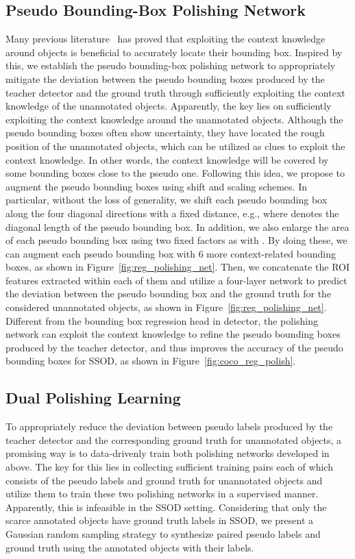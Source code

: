 \documentclass[letterpaper]{article} \usepackage{aaai23}  \usepackage{times}  \usepackage{helvet}  \usepackage{courier}  \usepackage[hyphens]{url}  \usepackage{graphicx} \urlstyle{rm} \def\UrlFont{\rm}  \usepackage{natbib}  \usepackage{caption} \frenchspacing  \setlength{\pdfpagewidth}{8.5in}  \setlength{\pdfpageheight}{11in}  \usepackage{algorithm}
\begin{document}
\subsection{Pseudo Bounding-Box Polishing Network}
\label{sec::regression_polishing_network}
Many previous literature~\cite{song2020revisiting} has proved that exploiting the context knowledge around objects is beneficial to accurately locate their bounding box. Inspired by this, we establish the pseudo bounding-box polishing network to appropriately mitigate the deviation between the pseudo bounding boxes produced by the teacher detector and the ground truth through sufficiently exploiting the context knowledge of the unannotated objects. Apparently, the key lies on sufficiently exploiting the context knowledge around the unannotated objects. Although the pseudo bounding boxes often show uncertainty, they have located the rough position of the unannotated objects, which can be utilized as clues to exploit the context knowledge. In other words, the context knowledge will be covered by some bounding boxes close to the pseudo one. Following this idea, we propose to augment the pseudo bounding boxes using shift and scaling schemes. In particular, without the loss of generality, we shift each pseudo bounding box along the four diagonal directions with a fixed distance, e.g.,  where  denotes the diagonal length of the pseudo bounding box. In addition, we also enlarge the area of each pseudo bounding box using two fixed factors as  with . By doing these, we can augment each pseudo bounding box with 6 more context-related bounding boxes, as shown in Figure~\ref{fig:reg_polishing_net}. Then, we concatenate the ROI features extracted within each of them and utilize a four-layer network to predict the deviation between the pseudo bounding box and the ground truth for the considered unannotated objects, as shown in Figure~\ref{fig:reg_polishing_net}. Different from the bounding box regression head in detector, the polishing network can exploit the context knowledge to refine the pseudo bounding boxes produced by the teacher detector, and thus improves the accuracy of the pseudo bounding boxes for SSOD, as shown in Figure~\ref{fig:coco_reg_polish}. 

\subsection{Dual Polishing Learning}\label{subsec:dual-pol}
To appropriately reduce the deviation between pseudo labels produced by the teacher detector and the corresponding ground truth for unannotated objects, a promising way is to data-drivenly train both polishing networks developed in above. The key for this lies in collecting sufficient training pairs each of which consists of the pseudo labels 
and ground truth for unannotated objects and utilize them to train these two polishing networks in a supervised manner. Apparently, this is infeasible in the SSOD setting. Considering that only the scarce annotated objects have ground truth labels in SSOD, we present a Gaussian random sampling strategy to synthesize paired pseudo labels and ground truth using the annotated objects with their labels.   
\end{document}
